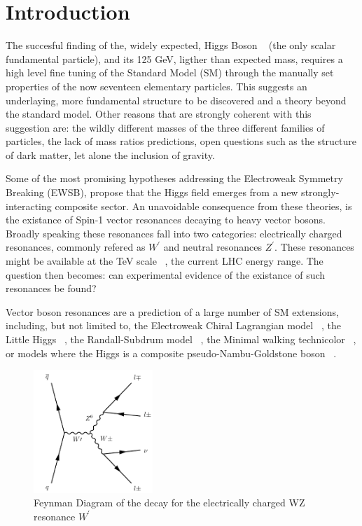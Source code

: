 \section{Introduction}

The succesful finding of the, widely expected, Higgs Boson ~\cite{higgsPaperCMS,higgsPaperATLAS}
(the only scalar fundamental particle), and its 125 GeV, ligther than expected mass,
requires a high level fine tuning of the Standard Model (SM) through the
manually set properties of the now seventeen elementary particles.
This suggests an underlaying, more fundamental structure to be discovered and
a theory beyond the standard model. Other
reasons that are strongly coherent with this suggestion are: the wildly
different masses of the three different families of particles, the lack of
mass ratios predictions, open questions such as the structure of dark matter,
let alone the inclusion of gravity.

Some of the most promising hypotheses addressing the Electroweak Symmetry
Breaking (EWSB), propose that the Higgs field
emerges from a new strongly-interacting composite sector. An unavoidable
consequence from these theories, is the existance of Spin-1 vector resonances
decaying to heavy vector bosons.  Broadly speaking these resonances
fall into  two categories: electrically
charged resonances, commonly refered as $W^{\prime}$ and
neutral resonances $Z^{\prime}$. These resonances might be available at the TeV
scale ~\cite{tevscale2014}, the current LHC energy range. The question then becomes:
can experimental evidence of the existance of such resonances be found?

Vector boson resonances are a prediction of a large number
of SM extensions, including, but not limited to, the Electroweak Chiral
Lagrangian model ~\cite{echl2017}, the Little Higgs
~\cite{littlehiggs2007}, the Randall-Subdrum  model ~\cite{randall1999}, the
Minimal walking technicolor ~\cite{technicolor2007}, or models where the Higgs
is a composite pseudo-Nambu-Goldstone boson ~\cite{composite2016}.

\begin{figure}[tph]
  \centering
  \includegraphics[width=0.4\textwidth]{fig/WprimeFeynmanDiagram.pdf}
  \caption{ Feynman Diagram of the decay for the
    electrically charged WZ resonance $W^{\prime}$}
  \label{fig:Wprime_FeynmanDiagram}
\end{figure}

